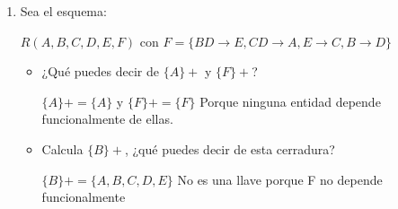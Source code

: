 \documentclass{article}
\begin{document}
\begin{enumerate}
\begin{itemize}
         $ C \rightarrow D$
         
         $A \rightarrow C$
         
         $A \rightarrow GBH $
         
         $B \rightarrow A$
         
         $B \rightarrow H $
         
         ahora por la derecha
         
         $ C \rightarrow D$
         
         $A \rightarrow C$
         
         $A \rightarrow GB$
         
         $B \rightarrow A$
         
         $B \rightarrow H $

         
         \item \textbf{Normaliza} de acuerdo a la \textbf{3NF}. Indica claramente las relaciones resultantes y en cada esquema, las dependencias funcionales que se cumplen.

         
        R1(C, D) $ C \rightarrow D$
         
        R2(A, C) $A \rightarrow C$
         
        R3(A, G, B) $A \rightarrow GB $
         
        R4(B, A) $B \rightarrow A $
        
        R5(B, H) $B \rightarrow H $
         
        
    \end{itemize}
    
    
    \item Sea el esquema:
    
    $R (A, B, C, D, E, F)$ con $F = \{ BD \rightarrow E, CD \rightarrow A, E \rightarrow C, B \rightarrow D \}$
    
    \begin{itemize}
        \item ¿Qué puedes decir de $\{A\}+$ y $\{F\}+$?
        
        $\{A\}+ =  \{A\}$ y $\{F\}+ = \{F\}$ Porque ninguna entidad depende funcionalmente
        de ellas.
        
        \item Calcula $\{B\}+$, ¿qué puedes decir de esta cerradura?

        $\{B\}+ =  \{A, B, C, D, E\}$ No es una llave porque F no depende funcionalmente  
        

\end{itemize}
\end{enumerate}
\end{document}
